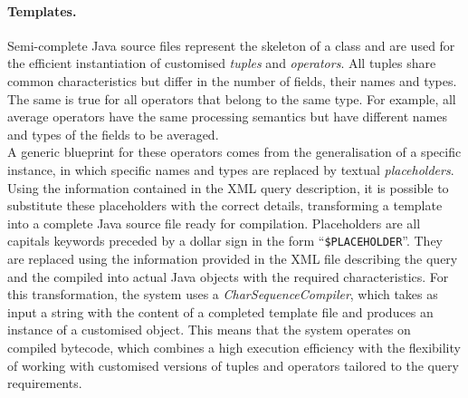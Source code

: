 \paragraph{Templates.} Semi-complete \textrm{Java} source files represent the skeleton of a class and
are used for the efficient instantiation of customised \textit{tuples} and \textit{operators}.
All tuples share common characteristics but differ in the number of fields, their names and types. The
same is true for all operators that belong to the same type. For example, all average operators have the
same processing semantics but have different names and types of the fields to be averaged. \\
A generic blueprint for these operators comes from the generalisation of a specific instance, in which
specific names and types are replaced by textual \emph{placeholders}.
Using the information contained in the XML query description, it is possible to substitute these
placeholders with the correct details, transforming a template into a complete \textrm{Java} source file
ready for compilation.
Placeholders are all capitals keywords preceded by a dollar sign in the form ``\texttt{\$PLACEHOLDER}''.
They are replaced using the information provided in the XML file describing the query and the compiled
into actual Java objects with the required characteristics.
For this transformation, the system uses a \textit{CharSequenceCompiler}, which takes as input a string
with the content of a completed \textrm{template} file and produces an instance of a customised object.
This means that the system operates on compiled bytecode, which combines a high execution efficiency with
the flexibility of working with customised versions of tuples and operators tailored to the query
requirements.

